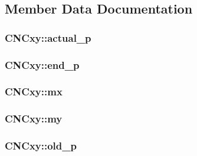 \subsection{Member Data Documentation}
\hypertarget{class_c_n_cxy_ae9fd8205dff0ba54bb540d3c087f3648}{
\subsubsection[{actual\+\_\+p}]{ C\+N\+Cxy\+::actual\+\_\+p\hspace{0.3cm}{\ttfamily [private]}}}\label{class_c_n_cxy_ae9fd8205dff0ba54bb540d3c087f3648}
\hypertarget{class_c_n_cxy_a05e392fc9ee4a988a572d19e14b72cb6}{
\subsubsection[{end\+\_\+p}]{ C\+N\+Cxy\+::end\+\_\+p\hspace{0.3cm}{\ttfamily [private]}}}\label{class_c_n_cxy_a05e392fc9ee4a988a572d19e14b72cb6}
\hypertarget{class_c_n_cxy_a82c1a00846aa58fd6418f5b2ee0461bf}{
\subsubsection[{mx}]{ C\+N\+Cxy\+::mx\hspace{0.3cm}{\ttfamily [private]}}}\label{class_c_n_cxy_a82c1a00846aa58fd6418f5b2ee0461bf}
\hypertarget{class_c_n_cxy_ab8a50121a78a388da72fb7afa7976ab6}{
\subsubsection[{my}]{ C\+N\+Cxy\+::my\hspace{0.3cm}{\ttfamily [private]}}}\label{class_c_n_cxy_ab8a50121a78a388da72fb7afa7976ab6}
\hypertarget{class_c_n_cxy_aeb098f15e8a8b543000d9ef37e9feef9}{
\subsubsection[{old\+\_\+p}]{ C\+N\+Cxy\+::old\+\_\+p\hspace{0.3cm}{\ttfamily [private]}}}\label{class_c_n_cxy_aeb098f15e8a8b543000d9ef37e9feef9}
